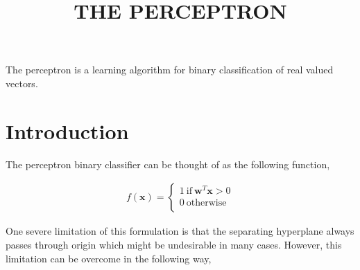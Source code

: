 \documentclass[11pt, a4paper]{article}
\begin{document}
\title{THE PERCEPTRON}
\date{}
\maketitle

The perceptron is a learning algorithm for binary classification of real valued vectors. 

\section{Introduction}

The perceptron binary classifier can be thought of as the following function,

\begin{align*}
	f(\boldsymbol{x}) = \left\{                       
	\begin{array}{ll}                                 
	1\ \text{if}\ \boldsymbol{w}^T \boldsymbol{x} > 0 \\
	0\ \text{otherwise}                               \\
	\end{array}                                       
	\right.                                           
\end{align*}

\begin{figure}[htbp]
	\centering
\end{figure}

One severe limitation of this formulation is that the separating hyperplane always passes through origin which might be undesirable in many cases. However, this limitation can be overcome in the following way,
\end{document}
